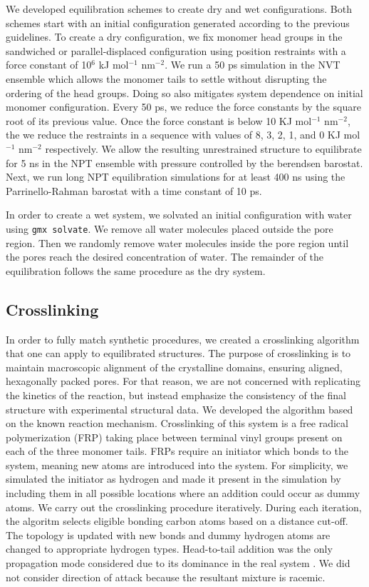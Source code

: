 \documentclass{article}
\begin{document}
  We developed equilibration schemes to create dry and wet configurations. Both
  schemes start with an initial configuration generated according to the previous
  guidelines. To create a dry configuration, we fix monomer head groups in the
  sandwiched or parallel-displaced configuration using position restraints with a
  force constant of 10$^6$ kJ mol$^{-1}$ nm$^{-2}$. We run a 50 ps simulation in
  the NVT ensemble which allows the monomer tails to settle without disrupting
  the ordering of the head groups. Doing so also mitigates system dependence on
  initial monomer configuration. Every 50 ps, we reduce the force constants by
  the square root of its previous value. Once the force constant is below 10 KJ
  mol$^{-1}$ nm$^{-2}$, the we reduce the restraints in a sequence with values of
  8, 3, 2, 1, and 0 KJ mol$^{-1}$ nm$^{-2}$ respectively. We allow the resulting
  unrestrained structure to equilibrate for 5 ns in the NPT ensemble
  with pressure controlled by the berendsen barostat. Next, we run long NPT
  equilibration simulations for at least 400 ns using the Parrinello-Rahman
  barostat with a time constant of 10 ps.

  In order to create a wet system, we solvated an initial configuration with
  water using \texttt{gmx solvate}. We remove all water molecules placed outside
  the pore region. Then we randomly remove water molecules inside the pore region
  until the pores reach the desired concentration of water. The remainder of the
  equilibration follows the same procedure as the dry system. 

  \subsection{Crosslinking}
  
  In order to fully match synthetic procedures, we created a crosslinking
  algorithm that one can apply to equilibrated structures. The purpose of
  crosslinking is to maintain macroscopic alignment of the crystalline domains,
  ensuring aligned, hexagonally packed pores. For that reason, we are not
  concerned with replicating the kinetics of the reaction, but instead emphasize
  the consistency of the final structure with experimental structural data. We
  developed the algorithm based on the known reaction mechanism. Crosslinking of
  this system is a free radical polymerization (FRP) taking place between
  terminal vinyl groups present on each of the three monomer tails. FRPs require
  an initiator which bonds to the system, meaning new atoms are introduced into
  the system. For simplicity, we simulated the initiator as hydrogen and made it
  present in the simulation by including them in all possible locations where an
  addition could occur as dummy atoms. We carry out the crosslinking procedure
  iteratively. During each iteration, the algoritm selects eligible bonding
  carbon atoms based on a distance cut-off. The topology is updated with new
  bonds and dummy hydrogen atoms are changed to appropriate hydrogen types.
  Head-to-tail addition was the only propagation mode considered due to its
  dominance in the real system \cite{young_introduction_2011}. We did not
  consider direction of attack because the resultant mixture is racemic.
\end{document}
